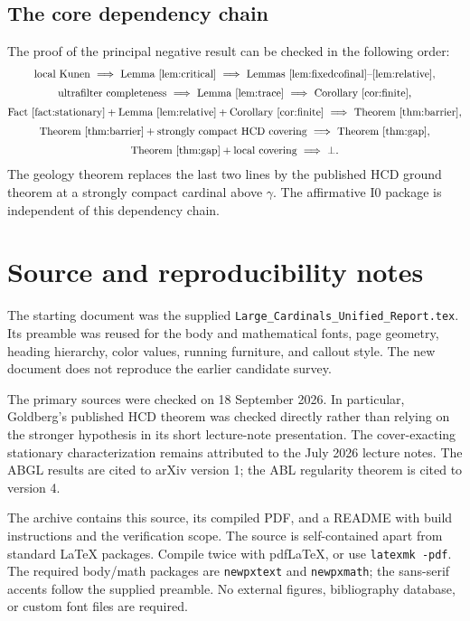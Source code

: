 \documentclass[11pt,letterpaper]{article}
\theoremstyle{definition}
\newcommand{\Izero}{\mathrm{I0}}
\begin{document}
\subsection{The core dependency chain}

The proof of the principal negative result can be checked in the following order:
\[
 \begin{gathered}
 \text{local Kunen}\ \Longrightarrow\ \text{Lemma~\ref{lem:critical}}
 \ \Longrightarrow\ \text{Lemmas~\ref{lem:fixedcofinal}--\ref{lem:relative}},\\[3pt]
 \text{ultrafilter completeness}\ \Longrightarrow\ \text{Lemma~\ref{lem:trace}}
 \ \Longrightarrow\ \text{Corollary~\ref{cor:finite}},\\[3pt]
 \text{Fact~\ref{fact:stationary}}+
 \text{Lemma~\ref{lem:relative}}+\text{Corollary~\ref{cor:finite}}
 \ \Longrightarrow\ \text{Theorem~\ref{thm:barrier}},\\[3pt]
 \text{Theorem~\ref{thm:barrier}}+\text{strongly compact HCD covering}
 \ \Longrightarrow\ \text{Theorem~\ref{thm:gap}},\\[3pt]
 \text{Theorem~\ref{thm:gap}}+\text{local covering}
 \ \Longrightarrow\ \bot.
 \end{gathered}
\]
The geology theorem replaces the last two lines by the published HCD ground
theorem at a strongly compact cardinal above $\gamma$. The affirmative
$\Izero$ package is independent of this dependency chain.

\section{Source and reproducibility notes}\label{app:sources}

The starting document was the supplied
\nolinkurl{Large_Cardinals_Unified_Report.tex}. Its preamble was reused for
the body and mathematical fonts, page geometry, heading hierarchy, color
values, running furniture, and callout style. The new document does not
reproduce the earlier candidate survey.

The primary sources were checked on 18 September 2026. In particular,
Goldberg's published HCD theorem was checked directly rather than relying
on the stronger hypothesis in its short lecture-note presentation.
The cover-exacting stationary characterization remains attributed to the
July 2026 lecture notes. The ABGL results are cited to arXiv version 1; the
ABL regularity theorem is cited to version 4.

The archive contains this source, its compiled PDF, and a README with build
instructions and the verification scope. The source is self-contained apart
from standard LaTeX packages. Compile twice with pdfLaTeX, or use
\texttt{latexmk -pdf}. The required body/math packages are \texttt{newpxtext}
and \texttt{newpxmath}; the sans-serif accents follow the supplied preamble.
No external figures, bibliography database, or custom font files are required.
\end{document}

